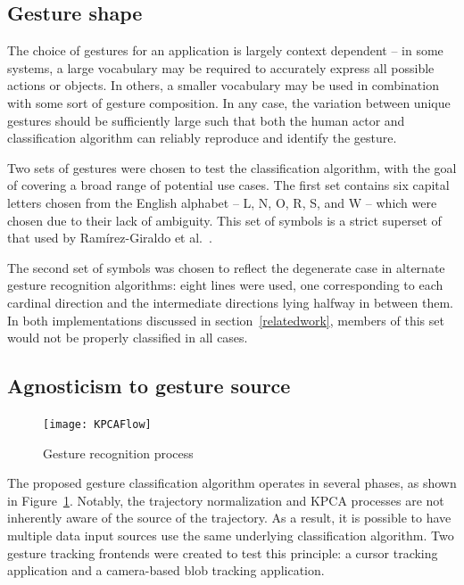 \documentclass[12pt,journal,compsoc]{IEEEtran}
\begin{document}
\subsection{Gesture shape}

The choice of gestures for an application is largely context dependent -- in some systems,
a large vocabulary may be required to accurately express all possible actions or objects.
In others, a smaller vocabulary may be used in combination with some sort of gesture composition.
In any case, the variation between unique gestures should be sufficiently large such that
both the human actor and classification algorithm can reliably reproduce and identify the gesture.
\par 
Two sets of gestures were chosen to test the classification algorithm, with the goal of covering
a broad range of potential use cases. The first set contains six capital letters chosen from
the English alphabet -- L, N, O, R, S, and W -- which were chosen due to their lack of ambiguity.
This set of symbols is a strict superset of that used by Ramírez-Giraldo et al.~\cite{giraldo12}.
\par
The second set of symbols was chosen to reflect the degenerate case in alternate gesture
recognition algorithms: eight lines were used, one corresponding to each cardinal direction
and the intermediate directions lying halfway in between them. In both implementations
discussed in section~\ref{relatedwork}, members of this set would not be properly classified
in all cases.

\subsection{Agnosticism to gesture source}

\begin{figure}
	\centering
	\texttt{[image: KPCAFlow]}
	\caption{Gesture recognition process}
    \label{fig:KPCAFlow}
\end{figure}

The proposed gesture classification algorithm operates in several phases, as shown in
Figure~\ref{fig:KPCAFlow}. Notably, the trajectory normalization and KPCA processes are
not inherently aware of the source of the trajectory. As a result, it is possible to
have multiple data input sources use the same underlying classification algorithm.
Two gesture tracking frontends were created to test this principle: a cursor tracking
application and a camera-based blob tracking application.
\end{document}
